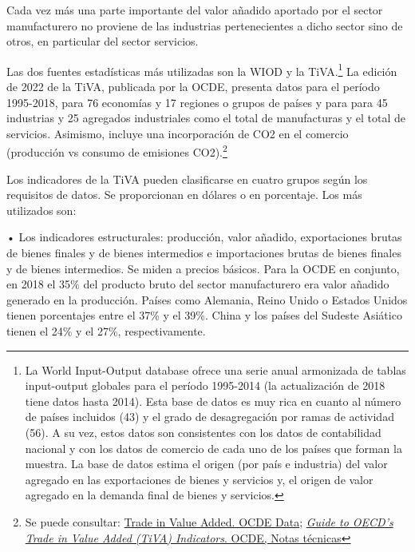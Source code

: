 \documentclass[10pt,a4paper]{article}
\begin{document}
{Cada vez más una parte importante del valor añadido aportado por el sector manufacturero no proviene de las industrias pertenecientes a dicho sector sino de otros, en particular del sector servicios.

Las dos fuentes estadísticas más utilizadas son la WIOD y la TiVA.\footnote{%
    La World Input-Output database ofrece una serie anual armonizada de tablas input-output globales para el período 1995-2014 (la actualización de 2018 tiene datos hasta 2014). Esta base de datos es muy rica en cuanto al número de países incluidos (43) y el grado de desagregación por ramas de actividad (56). A su vez, estos datos son consistentes con los datos de contabilidad nacional y con los datos de comercio de cada uno de los países que forman la muestra. La base de datos estima el origen (por país e industria) del valor agregado en las exportaciones de bienes y servicios y, el origen de valor agregado en la demanda final de bienes y servicios.
} La edición de 2022 de la TiVA, publicada por la OCDE, presenta datos para el período 1995-2018, para 76 economías y 17 regiones o grupos de países y para para 45 industrias y 25 agregados industriales como el total de manufacturas y el total de servicios. Asimismo, incluye una incorporación de CO2 en el comercio (producción vs consumo de emisiones CO2).\footnote{%
    Se puede consultar: \href{https://www.oecd.org/sti/ind/measuring-trade-in-value-added.htm}{Trade in Value Added. OCDE Data}; \href{https://www.google.com/url?sa=t&source=web&rct=j&opi=89978449&url=https://stats.oecd.org/wbos/fileview2.aspx%3FIDFile%3D2143f34e-6feb-41a9-abaf-cb52132608c4&ved=2ahUKEwidsYT6x6CVAxUo1wIHHbUkM4UQFnoECBsQAQ&usg=AOvVaw3dEO-gY0lFn9t9m8Fxz4yG}{\textit{Guide to OECD's Trade in Value Added (TiVA) Indicators}. OCDE, Notas técnicas}
}

Los indicadores de la TiVA pueden clasificarse en cuatro grupos según los requisitos de datos. Se proporcionan en dólares o en porcentaje. Los más utilizados son:

• Los indicadores estructurales: producción, valor añadido, exportaciones brutas de bienes finales y de bienes intermedios e importaciones brutas de bienes finales y de bienes intermedios. Se miden a precios básicos. Para la OCDE en conjunto, en 2018 el 35\% del producto bruto del sector manufacturero era valor añadido generado en la producción. Países como Alemania, Reino Unido o Estados Unidos tienen porcentajes entre el 37\% y el 39\%. China y los países del Sudeste Asiático tienen el 24\% y el 27\%, respectivamente. 

}
\end{document}
